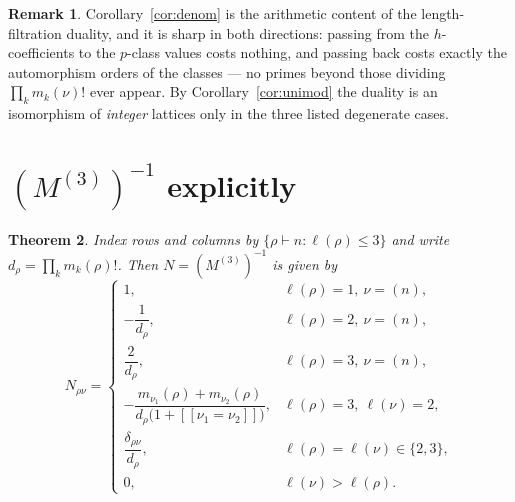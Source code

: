 \documentclass[11pt]{article}
\newtheorem{theorem}{Theorem}
\theoremstyle{definition}
\newtheorem{remark}[theorem]{Remark}
\newcommand{\bb}[1]{[\![#1]\!]}
\begin{document}
\begin{remark}
Corollary~\ref{cor:denom} is the arithmetic content of the length-filtration duality, and it is sharp
in both directions: passing from the $h$-coefficients to the $p$-class values costs nothing, and
passing back costs exactly the automorphism orders of the classes --- no primes beyond those dividing
$\prod_k m_k(\nu)!$ ever appear. By Corollary~\ref{cor:unimod} the duality is an isomorphism of
\emph{integer} lattices only in the three listed degenerate cases.
\end{remark}

\section{$(M^{(3)})^{-1}$ explicitly}

\begin{theorem}\label{thm:M3inv}
Index rows and columns by $\{\rho\vdash n:\ell(\rho)\le3\}$ and write $d_\rho=\prod_k m_k(\rho)!$.
Then $N=(M^{(3)})^{-1}$ is given by
\[
N_{\rho\nu}=
\begin{cases}
1, & \ell(\rho)=1,\ \nu=(n),\\[2pt]
-\dfrac{1}{d_\rho}, & \ell(\rho)=2,\ \nu=(n),\\[6pt]
\dfrac{2}{d_\rho}, & \ell(\rho)=3,\ \nu=(n),\\[6pt]
-\dfrac{m_{\nu_1}(\rho)+m_{\nu_2}(\rho)}{d_\rho\bigl(1+\bb{\nu_1=\nu_2}\bigr)},
  & \ell(\rho)=3,\ \ell(\nu)=2,\\[8pt]
\dfrac{\delta_{\rho\nu}}{d_\rho}, & \ell(\rho)=\ell(\nu)\in\{2,3\},\\[6pt]
0, & \ell(\nu)>\ell(\rho).
\end{cases}
\]
\end{theorem}
\end{document}
